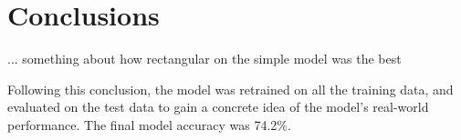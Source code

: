 \documentclass[class=report,11pt,crop=false]{standalone}
\begin{document}
\ifstandalone
\tableofcontents
\fi
\section{Conclusions \label{ch:conclusions}}


... something about how rectangular on the simple model was the best

Following this conclusion, the model was retrained on all the training data, and evaluated on the test data to gain a concrete idea of the model's real-world performance. The final model accuracy was 74.2\%.




\ifstandalone

\printnoidxglossary[type=\acronymtype,nonumberlist]
\fi
\end{document}
